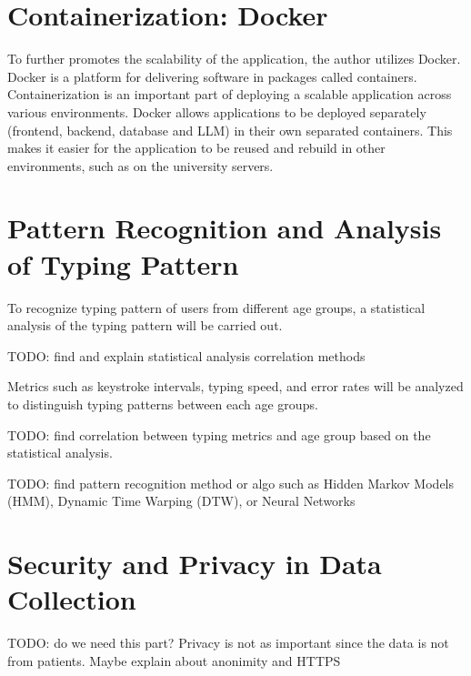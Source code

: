 \section{Containerization: Docker}
To further promotes the scalability of the application, the author utilizes Docker.
Docker is a platform for delivering software in packages called containers.
Containerization is an important part of deploying a scalable application across various environments.
Docker allows applications to be deployed separately (frontend, backend, database and \ac{LLM}) in their own separated containers.
This makes it easier for the application to be reused and rebuild in other environments, such as on the university servers.

\section{Pattern Recognition and Analysis of Typing Pattern}
To recognize typing pattern of users from different age groups, a statistical analysis of the typing pattern will be carried out.

TODO: find and explain statistical analysis correlation methods

Metrics such as keystroke intervals, typing speed, and error rates will be analyzed to distinguish typing patterns between each age groups. 

TODO: find correlation between typing metrics and age group based on the statistical analysis.

TODO: find pattern recognition method or algo such as Hidden Markov Models (HMM), Dynamic Time Warping (DTW), or Neural Networks 

\section{Security and Privacy in Data Collection}
TODO: do we need this part? Privacy is not as important since the data is not from patients. Maybe explain about anonimity and HTTPS
